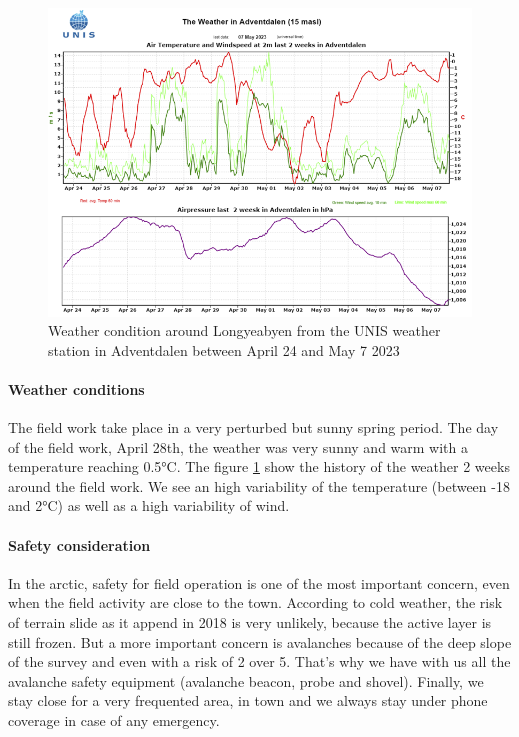 \begin{figure}
    \centering
    \includegraphics[width=\linewidth]{Images/00_Methodology/WeatherConditions.png}
    \caption{Weather condition around Longyeabyen from the UNIS weather station in Adventdalen between April 24 and May 7 2023}
    \label{fig:weather}
\end{figure}


\paragraph{Weather conditions} The field work take place in a very perturbed but sunny spring period. The day of the field work, April 28th, the weather was very sunny and warm with a temperature reaching 0.5°C. The figure \ref{fig:weather} show the history of the weather 2 weeks around the field work. We see an high variability of the temperature (between -18 and 2°C) as well as a high variability of wind.


\paragraph{Safety consideration} In the arctic, safety for field operation is one of the most important concern, even when the field activity are close to the town. According to cold weather, the risk of terrain slide as it append in 2018 is very unlikely, because the active layer is still frozen. But a more important concern is avalanches because of the deep slope of the survey and even with a risk of 2 over 5. That's why we have with us all the avalanche safety equipment (avalanche beacon, probe and shovel).
Finally, we stay close for a very frequented area, in town and we always stay under phone coverage in case of any emergency.

